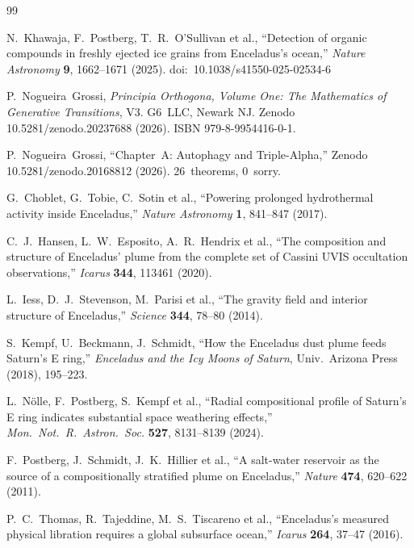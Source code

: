 \documentclass[12pt]{article}
\numberwithin{equation}{section}
\theoremstyle{remark}
\begin{document}
\begin{thebibliography}{99}

N.~Khawaja, F.~Postberg, T.~R.~O'Sullivan et al.,
``Detection of organic compounds in freshly ejected ice grains from
  Enceladus's ocean,''
\emph{Nature Astronomy} \textbf{9}, 1662--1671 (2025).
doi:~10.1038/s41550-025-02534-6

P.~Nogueira~Grossi,
\emph{Principia Orthogona, Volume One: The Mathematics of Generative Transitions},
V3. G6~LLC, Newark NJ.
Zenodo 10.5281/zenodo.20237688 (2026).
ISBN 979-8-9954416-0-1.

P.~Nogueira~Grossi,
``Chapter~A: Autophagy and Triple-Alpha,''
Zenodo 10.5281/zenodo.20168812 (2026). 26~theorems, 0~sorry.

G.~Choblet, G.~Tobie, C.~Sotin et al.,
``Powering prolonged hydrothermal activity inside Enceladus,''
\emph{Nature Astronomy} \textbf{1}, 841--847 (2017).

C.~J.~Hansen, L.~W.~Esposito, A.~R.~Hendrix et al.,
``The composition and structure of Enceladus' plume from the complete set of
  Cassini UVIS occultation observations,''
\emph{Icarus} \textbf{344}, 113461 (2020).

L.~Iess, D.~J.~Stevenson, M.~Parisi et al.,
``The gravity field and interior structure of Enceladus,''
\emph{Science} \textbf{344}, 78--80 (2014).

S.~Kempf, U.~Beckmann, J.~Schmidt,
``How the Enceladus dust plume feeds Saturn's E ring,''
\emph{Enceladus and the Icy Moons of Saturn},
Univ.\ Arizona Press (2018), 195--223.

L.~N{\"o}lle, F.~Postberg, S.~Kempf et al.,
``Radial compositional profile of Saturn's E ring indicates substantial
  space weathering effects,''
\emph{Mon.\ Not.\ R.\ Astron.\ Soc.} \textbf{527}, 8131--8139 (2024).

F.~Postberg, J.~Schmidt, J.~K.~Hillier et al.,
``A salt-water reservoir as the source of a compositionally stratified plume
  on Enceladus,''
\emph{Nature} \textbf{474}, 620--622 (2011).

P.~C.~Thomas, R.~Tajeddine, M.~S.~Tiscareno et al.,
``Enceladus's measured physical libration requires a global subsurface ocean,''
\emph{Icarus} \textbf{264}, 37--47 (2016).


\end{thebibliography}
\end{document}
